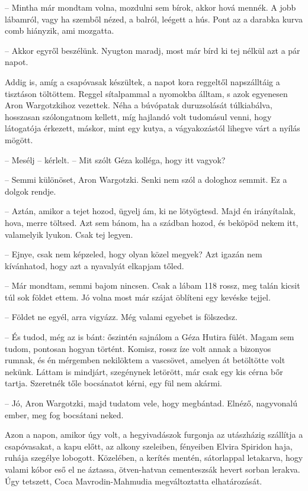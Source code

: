 \documentclass{IEEEtran}
\begin{document}
– Mintha már mondtam volna, mozdulni sem bírok, akkor hová mennék. A jobb
lábamról, vagy ha szemből nézed, a balról, leégett a hús. Pont az a darabka
kurva comb hiányzik, ami mozgatta.

– Akkor egyről beszélünk. Nyugton maradj, most már bírd ki tej nélkül azt a
pár napot.

Addig is, amíg a csapóvasak készültek, a napot kora reggeltől napszálltáig a
tisztáson töltöttem. Reggel sítalpammal a nyomokba álltam, s azok egyenesen
Aron Wargotzkihoz vezettek. Néha a búvópatak duruzsolását túlkiabálva,
hosszasan szólongatnom kellett, míg hajlandó volt tudomásul venni, hogy
látogatója érkezett, máskor, mint egy kutya, a vágyakozástól lihegve várt a
nyílás mögött.

– Mesélj – kérlelt. – Mit szólt Géza kolléga, hogy itt vagyok?

– Semmi különöset, Aron Wargotzki. Senki nem szól a dologhoz semmit. Ez a
dolgok rendje.

– Aztán, amikor a tejet hozod, ügyelj ám, ki ne lötyögtesd. Majd én
irányítalak, hova, merre töltsed. Azt sem bánom, ha a szádban hozod, és
beköpöd nekem itt, valamelyik lyukon. Csak tej legyen.

– Ejnye, csak nem képzeled, hogy olyan közel megyek? Azt igazán nem
kívánhatod, hogy azt a nyavalyát elkapjam tőled.

– Már mondtam, semmi bajom nincsen. Csak a lábam 118 rossz, meg talán kicsit
túl sok földet ettem. Jó volna most már szájat öblíteni egy kevéske tejjel.

– Földet ne egyél, arra vigyázz. Még valami egyebet is fölszedsz.

– És tudod, még az is bánt: őszintén sajnálom a Géza Hutira fülét. Magam sem
tudom, pontosan hogyan történt. Komisz, rossz íze volt annak a bizonyos
rumnak, és én mérgemben nekilöktem a vascsövet, amelyen át betöltötte volt
nekünk. Láttam is mindjárt, szegénynek letörött, már csak egy kis cérna bőr
tartja. Szeretnék tőle bocsánatot kérni, egy fül nem akármi.

– Jó, Aron Wargotzki, majd tudatom vele, hogy megbántad. Elnéző, nagyvonalú
ember, meg fog bocsátani neked.

Azon a napon, amikor úgy volt, a hegyivadászok furgonja az utászházig
szállítja a csapóvasakat, a kapu előtt, az alkony szeleiben, fényeiben Elvira
Spiridon haja, ruhája szegélye lobogott. Közelében, a kerítés mentén,
sátorlappal letakarva, hogy valami kóbor eső el ne áztassa, ötven-hatvan
cementeszsák hevert sorban lerakva. Úgy tetszett, Coca Mavrodin-Mahmudia
megváltoztatta elhatározását.
\end{document}
